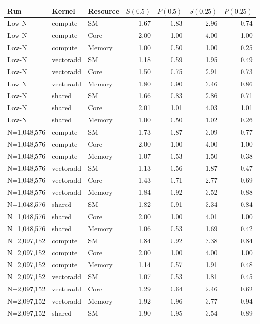 \begin{tabular}{lllrrrr}
\toprule
Run & Kernel & Resource & $S(0.5)$ & $P(0.5)$ & $S(0.25)$ & $P(0.25)$ \\
\midrule
Low-N & compute & SM & 1.67 & 0.83 & 2.96 & 0.74 \\
Low-N & compute & Core & 2.00 & 1.00 & 4.00 & 1.00 \\
Low-N & compute & Memory & 1.00 & 0.50 & 1.00 & 0.25 \\
Low-N & vectoradd & SM & 1.18 & 0.59 & 1.95 & 0.49 \\
Low-N & vectoradd & Core & 1.50 & 0.75 & 2.91 & 0.73 \\
Low-N & vectoradd & Memory & 1.80 & 0.90 & 3.46 & 0.86 \\
Low-N & shared & SM & 1.66 & 0.83 & 2.86 & 0.71 \\
Low-N & shared & Core & 2.01 & 1.01 & 4.03 & 1.01 \\
Low-N & shared & Memory & 1.00 & 0.50 & 1.02 & 0.26 \\
\midrule
N=1,048,576 & compute & SM & 1.73 & 0.87 & 3.09 & 0.77 \\
N=1,048,576 & compute & Core & 2.00 & 1.00 & 4.00 & 1.00 \\
N=1,048,576 & compute & Memory & 1.07 & 0.53 & 1.50 & 0.38 \\
N=1,048,576 & vectoradd & SM & 1.13 & 0.56 & 1.87 & 0.47 \\
N=1,048,576 & vectoradd & Core & 1.43 & 0.71 & 2.77 & 0.69 \\
N=1,048,576 & vectoradd & Memory & 1.84 & 0.92 & 3.52 & 0.88 \\
N=1,048,576 & shared & SM & 1.82 & 0.91 & 3.34 & 0.84 \\
N=1,048,576 & shared & Core & 2.00 & 1.00 & 4.01 & 1.00 \\
N=1,048,576 & shared & Memory & 1.06 & 0.53 & 1.69 & 0.42 \\
\midrule
N=2,097,152 & compute & SM & 1.84 & 0.92 & 3.38 & 0.84 \\
N=2,097,152 & compute & Core & 2.00 & 1.00 & 4.00 & 1.00 \\
N=2,097,152 & compute & Memory & 1.14 & 0.57 & 1.91 & 0.48 \\
N=2,097,152 & vectoradd & SM & 1.07 & 0.53 & 1.81 & 0.45 \\
N=2,097,152 & vectoradd & Core & 1.29 & 0.64 & 2.46 & 0.62 \\
N=2,097,152 & vectoradd & Memory & 1.92 & 0.96 & 3.77 & 0.94 \\
N=2,097,152 & shared & SM & 1.90 & 0.95 & 3.54 & 0.89 \\

\end{tabular}
